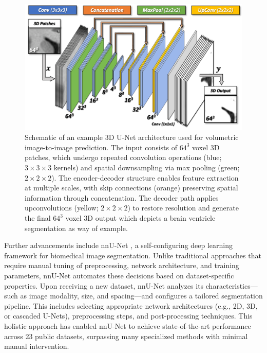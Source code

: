 \begin{figure}[hbt!]
     \centering
     \includegraphics[width=1\linewidth]{figs/ch1_Figure_UNET.png}
     \caption{Schematic of an example 3D U-Net architecture \cite{Ronneberger2015-xm,Cicek2016-dz} used for volumetric image-to-image prediction. The input consists of $64^3$ voxel 3D patches, which undergo repeated convolution operations (blue; $3{\times}3{\times}3$ kernels) and spatial downsampling via max pooling (green; $2{\times}2{\times}2$). The encoder-decoder structure enables feature extraction at multiple scales, with skip connections (orange) preserving spatial information through concatenation. The decoder path applies upconvolutions (yellow; $2{\times}2{\times}2$) to restore resolution and generate the final $64^3$ voxel 3D output which depicts a brain ventricle segmentation as way of example.}
     \label{fig:ch1_Figure_UNET}
 \end{figure} 
 
Further advancements include nnU-Net \cite{Isensee2021-ev}, a self-configuring deep learning framework for biomedical image segmentation. Unlike traditional approaches that require manual tuning of preprocessing, network architecture, and training parameters, nnU-Net automates these decisions based on dataset-specific properties. Upon receiving a new dataset, nnU-Net analyzes its characteristics—such as image modality, size, and spacing—and configures a tailored segmentation pipeline. This includes selecting appropriate network architectures (e.g., 2D, 3D, or cascaded U-Nets), preprocessing steps, and post-processing techniques. This holistic approach has enabled nnU-Net to achieve state-of-the-art performance across 23 public datasets, surpassing many specialized methods with minimal manual intervention.

